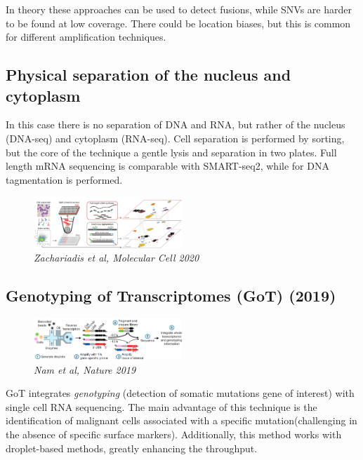 In theory these approaches can be used to detect fusions, while SNVs are
harder to be found at low coverage. There could be location biases, but
this is common for different amplification techniques.

\hypertarget{physical-separation-of-the-nucleus-and-cytoplasm}{%
\subsection{Physical separation of the nucleus and
cytoplasm}\label{physical-separation-of-the-nucleus-and-cytoplasm}}

In this case there is no separation of DNA and RNA, but rather of the
nucleus (DNA-seq) and cytoplasm (RNA-seq). Cell separation is performed
by sorting, but the core of the technique a gentle lysis and separation
in two plates. Full length mRNA sequencing is comparable with
SMART-seq2, while for DNA tagmentation is performed.

\begin{figure}
\centering
\includegraphics[width=0.5\textwidth]{images/Screenshot_4.png}
\caption{\emph{Zachariadis et al, Molecular Cell 2020}}
\end{figure}

\hypertarget{genotyping-of-transcriptomes-got-2019}{%
\subsection{Genotyping of Transcriptomes (GoT)
(2019)}\label{genotyping-of-transcriptomes-got-2019}}

\begin{figure}
\centering
\includegraphics[width=0.5\textwidth]{images/Screen_Shot_2023-02-22_at_20-38-39.png}
\caption{\emph{Nam et al, Nature 2019}}
\end{figure}

GoT integrates \emph{genotyping} (detection of somatic mutations gene of
interest) with single cell RNA sequencing. The main advantage of this
technique is the identification of malignant cells associated with a
specific mutation(challenging in the absence of specific surface
markers). Additionally, this method works with droplet-based methods,
greatly enhancing the throughput.

